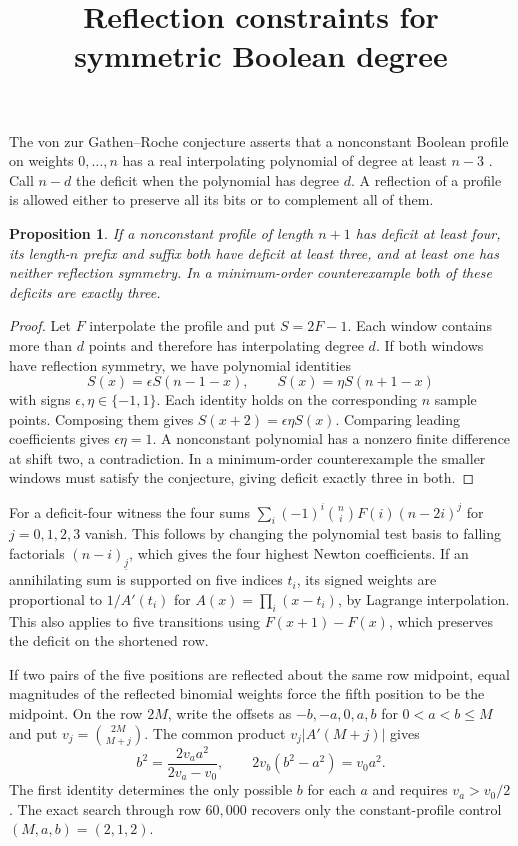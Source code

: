 \documentclass[10pt]{article}
\title{Reflection constraints for symmetric Boolean degree}
\author{}
\date{}
\newtheorem{proposition}{Proposition}
\begin{document}
\maketitle
\vspace{-2.4em}
The von zur Gathen--Roche conjecture asserts that a nonconstant Boolean profile on weights $0,\ldots,n$ has a real interpolating polynomial of degree at least $n-3$ \cite{original}. Call $n-d$ the deficit when the polynomial has degree $d$. A reflection of a profile is allowed either to preserve all its bits or to complement all of them.

\begin{proposition}
If a nonconstant profile of length $n+1$ has deficit at least four, its length-$n$ prefix and suffix both have deficit at least three, and at least one has neither reflection symmetry. In a minimum-order counterexample both of these deficits are exactly three.
\end{proposition}
\begin{proof}
Let $F$ interpolate the profile and put $S=2F-1$. Each window contains more than $d$ points and therefore has interpolating degree $d$. If both windows have reflection symmetry, we have polynomial identities
\[
 S(x)=\epsilon S(n-1-x),\qquad S(x)=\eta S(n+1-x)
\]
with signs $\epsilon,\eta\in\{-1,1\}$. Each identity holds on the corresponding $n$ sample points. Composing them gives $S(x+2)=\epsilon\eta S(x)$. Comparing leading coefficients gives $\epsilon\eta=1$. A nonconstant polynomial has a nonzero finite difference at shift two, a contradiction. In a minimum-order counterexample the smaller windows must satisfy the conjecture, giving deficit exactly three in both.
\end{proof}

For a deficit-four witness the four sums $\sum_i(-1)^i\binom ni F(i)(n-2i)^j$ for $j=0,1,2,3$ vanish. This follows by changing the polynomial test basis to falling factorials $(n-i)_{\underline j}$, which gives the four highest Newton coefficients. If an annihilating sum is supported on five indices $t_i$, its signed weights are proportional to $1/A'(t_i)$ for $A(x)=\prod_i(x-t_i)$, by Lagrange interpolation. This also applies to five transitions using $F(x+1)-F(x)$, which preserves the deficit on the shortened row.

If two pairs of the five positions are reflected about the same row midpoint, equal magnitudes of the reflected binomial weights force the fifth position to be the midpoint. On the row $2M$, write the offsets as $-b,-a,0,a,b$ for $0<a<b\le M$ and put $v_j=\binom{2M}{M+j}$. The common product $v_j|A'(M+j)|$ gives
\[
 b^2=\frac{2v_a a^2}{2v_a-v_0},\qquad 2v_b(b^2-a^2)=v_0 a^2.
\]
The first identity determines the only possible $b$ for each $a$ and requires $v_a>v_0/2$. The exact search through row $60{,}000$ recovers only the constant-profile control $(M,a,b)=(2,1,2)$.
\end{document}
